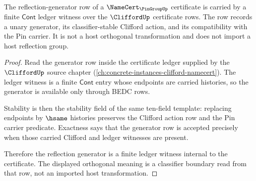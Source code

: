 \begin{theorem}
\label{thm:pingroup-reflection-generator-obligation}
The reflection-generator row of a $\NameCert_{\PinGroupUp}$ certificate is
carried by a finite $\mathsf{Cont}$ ledger witness over the $\CliffordUp$
certificate rows. The row records a unary generator, its classifier-stable
Clifford action, and its compatibility with the Pin carrier. It is not a host
orthogonal transformation and does not import a host reflection group.
\end{theorem}
\begin{proof}
Read the generator row inside the certificate ledger supplied by the
$\CliffordUp$ source chapter
(\autoref{ch:concrete-instances-clifford-namecert}). The ledger witness is a
finite $\mathsf{Cont}$ entry whose endpoints are carried histories, so the
generator is available only through BEDC rows.

Stability is then the stability field of the same ten-field template: replacing
endpoints by $\hsame$ histories preserves the Clifford action row and the Pin
carrier predicate. Exactness says that the generator row is accepted precisely
when those carried Clifford and ledger witnesses are present.

Therefore the reflection generator is a finite ledger witness internal to the
certificate. The displayed orthogonal meaning is a classifier boundary read
from that row, not an imported host transformation.
\end{proof}

